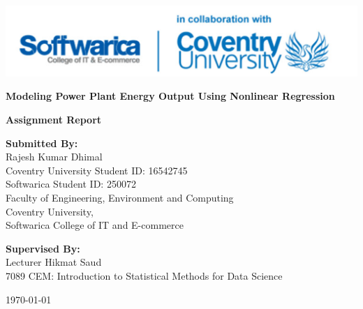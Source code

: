 \documentclass[12pt,a4paper]{article}
\begin{document}
\begin{titlepage}
    \centering
    
    \includegraphics[width=0.9\linewidth]{softwarica_covventry.png}

    \vspace{1cm}

    {\Huge \bfseries Modeling Power Plant Energy Output Using Nonlinear Regression \par}
    \vspace{1.5cm}
    

    {\Large \textbf{Assignment Report} \par}
    \vspace{1.5cm}
    
    \textbf{Submitted By:} \\
    {\large Rajesh Kumar Dhimal} \\
    Coventry University Student ID: 16542745 \\
    Softwarica Student ID: 250072 \\
    Faculty of Engineering, Environment and Computing  \\
    Coventry University, \\ 
    Softwarica College of IT and E-commerce
    \vspace{1cm}
    
    \textbf{Supervised By:} \\
    Lecturer Hikmat Saud \\
    7089 CEM: Introduction to Statistical Methods for Data Science \\
    \vspace{2cm}
    
    \vspace{1cm}
    {\large \today \par}
    \vfill

\end{titlepage}


\maketitle
\end{document}
